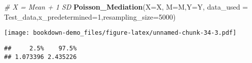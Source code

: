 \documentclass[]{book}
\newenvironment{Shaded}{\begin{snugshade}}{\end{snugshade}}
\newcommand{\CommentTok}[1]{\textcolor[rgb]{0.56,0.35,0.01}{\textit{#1}}}
\newcommand{\DataTypeTok}[1]{\textcolor[rgb]{0.13,0.29,0.53}{#1}}
\newcommand{\DecValTok}[1]{\textcolor[rgb]{0.00,0.00,0.81}{#1}}
\newcommand{\KeywordTok}[1]{\textcolor[rgb]{0.13,0.29,0.53}{\textbf{#1}}}
\newcommand{\NormalTok}[1]{#1}
\begin{document}
\begin{Shaded}
\begin{Highlighting}[]
\CommentTok{# X = Mean + 1 SD}
\KeywordTok{Poisson_Mediation}\NormalTok{(}\DataTypeTok{X=}\NormalTok{X, }\DataTypeTok{M=}\NormalTok{M,}\DataTypeTok{Y=}\NormalTok{Y, }\DataTypeTok{data_used =}\NormalTok{ Test_data,}\DataTypeTok{x_predetermined=}\DecValTok{1}\NormalTok{,}\DataTypeTok{resampling_size=}\DecValTok{5000}\NormalTok{)}
\end{Highlighting}
\end{Shaded}

\texttt{[image: bookdown-demo\_files/figure-latex/unnamed-chunk-34-3.pdf]}

\begin{verbatim}
##     2.5%    97.5% 
## 1.073396 2.435226
\end{verbatim}


\end{document}
